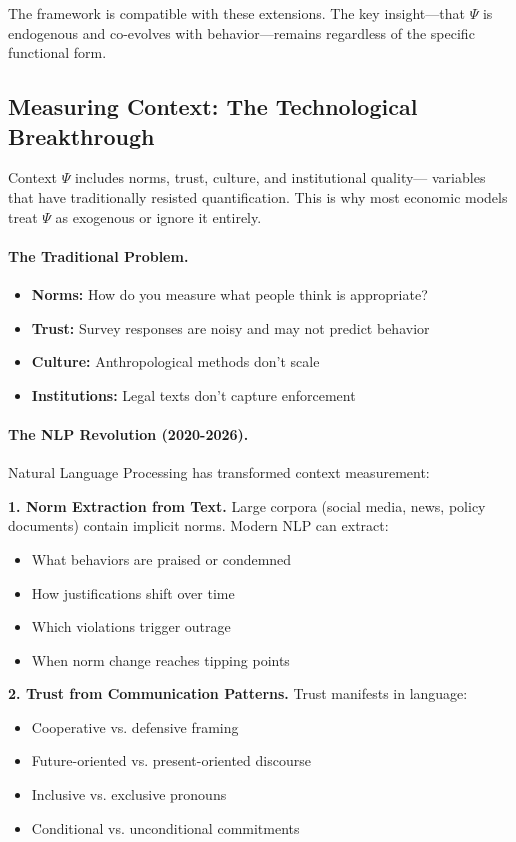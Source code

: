\documentclass[12pt,a4paper]{article}
\begin{document}
The framework is compatible with these extensions.
The key insight---that $\Psi$ is endogenous and co-evolves with behavior---remains
regardless of the specific functional form.

\subsection{Measuring Context: The Technological Breakthrough}

Context $\Psi$ includes norms, trust, culture, and institutional quality---
variables that have traditionally resisted quantification.
This is why most economic models treat $\Psi$ as exogenous or ignore it entirely.

\paragraph{The Traditional Problem.}
\begin{itemize}
  \item \textbf{Norms:} How do you measure what people think is appropriate?
  \item \textbf{Trust:} Survey responses are noisy and may not predict behavior
  \item \textbf{Culture:} Anthropological methods don't scale
  \item \textbf{Institutions:} Legal texts don't capture enforcement
\end{itemize}

\paragraph{The NLP Revolution (2020-2026).}
Natural Language Processing has transformed context measurement:

\textbf{1. Norm Extraction from Text.}
Large corpora (social media, news, policy documents) contain implicit norms.
Modern NLP can extract:
\begin{itemize}
  \item What behaviors are praised or condemned
  \item How justifications shift over time
  \item Which violations trigger outrage
  \item When norm change reaches tipping points
\end{itemize}

\textbf{2. Trust from Communication Patterns.}
Trust manifests in language:
\begin{itemize}
  \item Cooperative vs. defensive framing
  \item Future-oriented vs. present-oriented discourse
  \item Inclusive vs. exclusive pronouns
  \item Conditional vs. unconditional commitments
\end{itemize}
\end{document}
